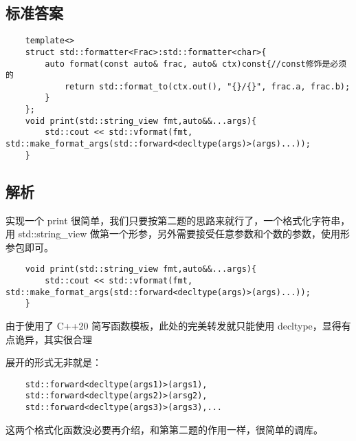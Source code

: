 

\subsection{标准答案}

\begin{verbatim}
    template<>
    struct std::formatter<Frac>:std::formatter<char>{
        auto format(const auto& frac, auto& ctx)const{//const修饰是必须的
            return std::format_to(ctx.out(), "{}/{}", frac.a, frac.b);
        }
    };
    void print(std::string_view fmt,auto&&...args){
        std::cout << std::vformat(fmt, std::make_format_args(std::forward<decltype(args)>(args)...));
    }
\end{verbatim}

\subsection{解析}

实现一个 print 很简单，我们只要按第二题的思路来就行了，一个格式化字符串，用 std::string\_view 做第一个形参，另外需要接受任意参数和个数的参数，使用形参包即可。

\begin{verbatim}
    void print(std::string_view fmt,auto&&...args){
        std::cout << std::vformat(fmt, std::make_format_args(std::forward<decltype(args)>(args)...));
    }
\end{verbatim}

由于使用了 C++20 简写函数模板，此处的完美转发就只能使用 decltype，显得有点诡异，其实很合理

展开的形式无非就是：

\begin{verbatim}
    std::forward<decltype(args1)>(args1),
    std::forward<decltype(args2)>(arsg2),
    std::forward<decltype(args3)>(args3),... 
\end{verbatim}

这两个格式化函数没必要再介绍，和第第二题的作用一样，很简单的调库。

\clearpage